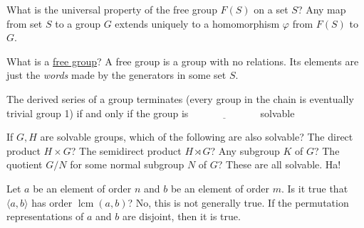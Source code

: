 \documentclass[avery5371,grid]{flashcards}
\newcommand{\blank}{$\; \underline{\hspace{1in}} \; $}
\DeclareMathOperator{\lcm}{lcm}
\let \phi \varphi
\begin{document}
\begin{flashcard}[Groups]{What is the universal property of the free group $F(S)$ on a set $S$?}
 Any map from set $S$ to a group $G$ extends uniquely to a homomorphism $\phi$ from $F(S)$ to $G$.
 \begin{center}
 \end{center}
\end{flashcard}

\begin{flashcard}[Groups]{What is a \underline{free group}?}
 A free group is a group with no relations. Its elements are just the \emph{words} made by the generators in some set $S$.
\end{flashcard}

\begin{flashcard}[Groups]{The derived series of a group terminates (every group in the chain is eventually trivial group 1) if and only if the group is \blank}
 solvable
\end{flashcard}

\begin{flashcard}[Groups]{If $G,H$ are solvable groups, which of the following are also solvable? The direct product $H \times G$? The semidirect product $H \rtimes G$? Any subgroup $K$ of $G$? The quotient $G/N$ for some normal subgroup $N$ of $G$?}
 These are all solvable. Ha!
\end{flashcard}

\begin{flashcard}[Groups]{Let $a$ be an element of order $n$ and $b$ be an element of order $m$. Is it true that $\langle a, b \rangle$ has order $\lcm(a,b)$?}
 No, this is not generally true. If the permutation representations of $a$ and $b$ are disjoint, then it is true.
\end{flashcard}
\end{document}
